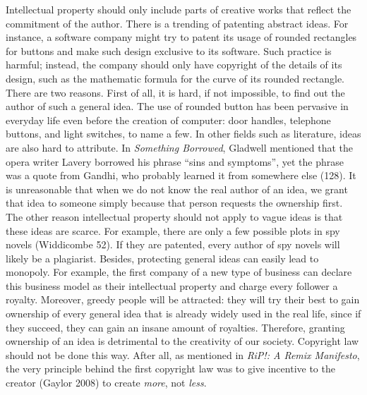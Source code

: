 \documentclass{writing}
\begin{document}
Intellectual property should only include parts of creative works that
reflect the commitment of the author. There is a trending of patenting
abstract ideas. For instance, a software company might try to patent its
usage of rounded rectangles for buttons and make such design exclusive
to its software. Such practice is harmful; instead, the company should
only have copyright of the details of its design, such as the mathematic
formula for the curve of its rounded rectangle. There are two reasons.
First of all, it is hard, if not impossible, to find out the author of
such a general idea. The use of rounded button has been pervasive in
everyday life even before the creation of computer: door handles,
telephone buttons, and light switches, to name a few. In other fields
such as literature, ideas are also hard to attribute. In \emph{Something
Borrowed}, Gladwell mentioned that the opera writer Lavery borrowed his
phrase ``sins and symptoms'', yet the phrase was a quote from Gandhi,
who probably learned it from somewhere else (128). It is unreasonable
that when we do not know the real author of an idea, we grant that idea
to someone simply because that person requests the ownership first. The
other reason intellectual property should not apply to vague ideas is
that these ideas are scarce. For example, there are only a few possible
plots in spy novels (Widdicombe 52). If they are patented, every author
of spy novels will likely be a plagiarist. Besides, protecting general
ideas can easily lead to monopoly. For example, the first company of a
new type of business can declare this business model as their
intellectual property and charge every follower a royalty. Moreover,
greedy people will be attracted: they will try their best to gain
ownership of every general idea that is already widely used in the real
life, since if they succeed, they can gain an insane amount of
royalties. Therefore, granting ownership of an idea is detrimental to
the creativity of our society. Copyright law should not be done this
way. After all, as mentioned in \emph{RiP!: A Remix Manifesto}, the very
principle behind the first copyright law was to give incentive to the
creator (Gaylor 2008) to create \emph{more}, not \emph{less}.
\end{document}
